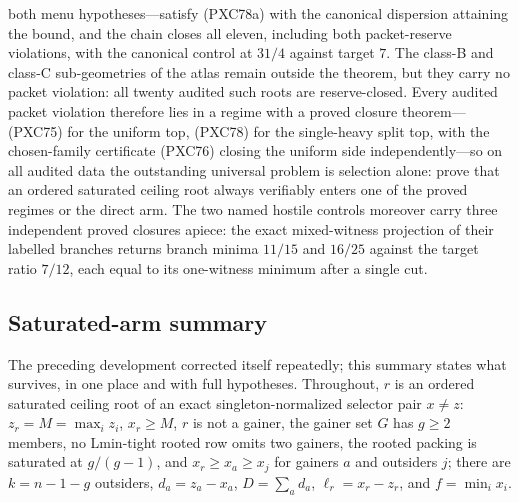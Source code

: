 \documentclass[11pt]{article}
\begin{document}
both menu hypotheses---satisfy (PXC78a) with the canonical dispersion
attaining the bound, and the chain closes all eleven, including both
packet-reserve violations, with the canonical control at $31/4$ against
target $7$.  The class-B and class-C sub-geometries of the atlas remain
outside the theorem, but they carry no packet violation: all twenty
audited such roots are reserve-closed.  Every audited packet violation
therefore lies in a regime with a proved closure theorem---(PXC75) for
the uniform top, (PXC78) for the single-heavy split top, with the
chosen-family certificate (PXC76) closing the uniform side
independently---so on all audited data the outstanding universal
problem is selection alone: prove that an ordered saturated ceiling
root always verifiably enters one of the proved regimes or the direct
arm.  The two named hostile controls moreover carry three independent
proved closures apiece: the exact mixed-witness projection of their
labelled branches returns branch minima $11/15$ and $16/25$ against the
target ratio $7/12$, each equal to its one-witness minimum after a
single cut.

\subsection*{Saturated-arm summary}

The preceding development corrected itself repeatedly; this summary
states what survives, in one place and with full hypotheses.  Throughout,
$r$ is an ordered saturated ceiling root of an exact singleton-normalized
selector pair $x\ne z$: $z_r=M=\max_iz_i$, $x_r\ge M$, $r$ is not a
gainer, the gainer set $G$ has $g\ge2$ members, no Lmin-tight rooted row
omits two gainers, the rooted packing is saturated at $g/(g-1)$, and
$x_r\ge x_a\ge x_j$ for gainers $a$ and outsiders $j$; there are
$k=n-1-g$ outsiders, $d_a=z_a-x_a$, $D=\sum_ad_a$, $\ell_r=x_r-z_r$, and
$f=\min_ix_i$.
\end{document}
